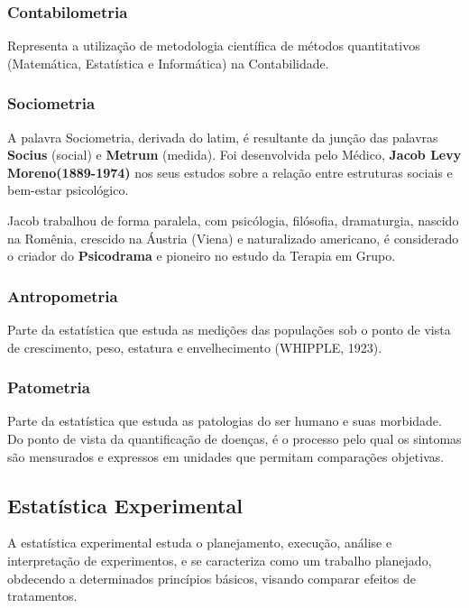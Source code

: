 \subsubsection{Contabilometria} 

Representa a utilização de metodologia científica de métodos quantitativos (Matemática, Estatística e Informática) na Contabilidade.


\newpage
\subsubsection{Sociometria}

A palavra Sociometria, derivada do latim, é resultante da junção das palavras \textbf{Socius} (social) e \textbf{Metrum} (medida). Foi desenvolvida pelo Médico, \textbf{Jacob Levy Moreno(1889-1974)} nos seus estudos sobre a relação entre estruturas sociais e bem-estar psicológico.\vst

Jacob trabalhou de forma paralela, com psicólogia, filósofia, dramaturgia, nascido na Romênia, crescido na Áustria (Viena) e naturalizado americano, é considerado o criador do \textbf{Psicodrama} e pioneiro no estudo da Terapia em Grupo. 

\subsubsection{Antropometria}
Parte da estatística que estuda as medições das populações sob o ponto de vista de crescimento, peso, estatura e envelhecimento (WHIPPLE, 1923).


\subsubsection{Patometria}

Parte da estatística que estuda as patologias do ser humano e suas morbidade. Do ponto de vista da quantificação de doenças, é o processo pelo qual os sintomas são mensurados e expressos em unidades que permitam comparações objetivas.



\subsection{Estatística Experimental}

A estatística experimental estuda o planejamento, execução, análise e interpretação de experimentos, e se caracteriza como um trabalho planejado, obdecendo a determinados princípios básicos, visando comparar efeitos de tratamentos.\vskip0.3cm

